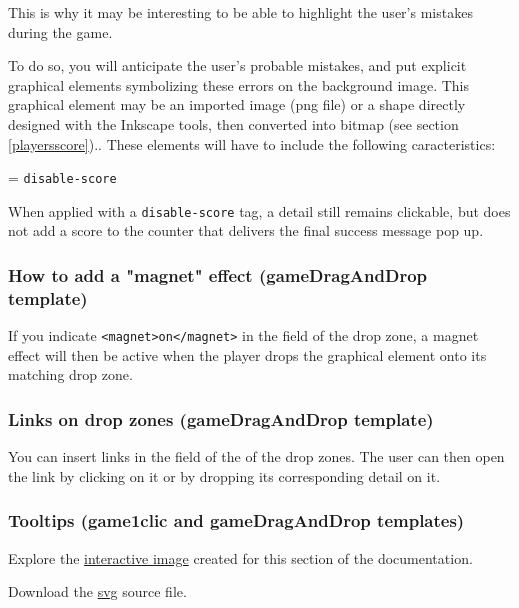 This is why it may be interesting to be able to 
highlight the user's mistakes during the game.

To do so, you will anticipate the user's probable mistakes, and 
put explicit graphical elements symbolizing these errors on the background image. 
This graphical element may be an imported image 
(png file) or a shape directly designed with the Inkscape tools, 
then converted into bitmap (see section \ref{playersscore}).. These elements will have to include the following caracteristics:
\begin{center}
 = \verb|disable-score| 
\end{center}
When applied with a \verb|disable-score| tag, a detail still remains clickable, but does not 
add a score to the counter that delivers the final success message pop up.


\subsubsection{How to add a "magnet" effect (gameDragAndDrop template)}

If you indicate \verb|<magnet>on</magnet>| in the  field of the drop zone, a magnet effect will then be active when the player drops the 
graphical element onto its matching drop zone.

\subsubsection{Links on drop zones (gameDragAndDrop template)}
 
You can insert links in the  field of the  
of the drop zones. The user can then open the link by clicking on it or by dropping its 
corresponding detail on it.


\subsubsection{Tooltips (game1clic and gameDragAndDrop templates)}

\begin{links}
Explore the \href{http://xia.dane.ac-versailles.fr/demo/tuto/xia7}{interactive image}
created for this section of the documentation.

Download the \href{http://xia.dane.ac-versailles.fr/demo/tuto/xia7/svg/xia7.svg}{svg} source file.
\end{links}

